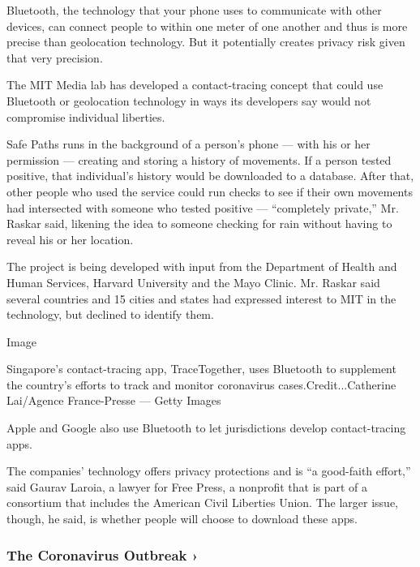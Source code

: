 Bluetooth, the technology that your phone uses to communicate with other
devices, can connect people to within one meter of one another and thus
is more precise than geolocation technology. But it potentially creates
privacy risk given that very precision.

The MIT Media lab has developed a contact-tracing concept that could use
Bluetooth or geolocation technology in ways its developers say would not
compromise individual liberties.

Safe Paths runs in the background of a person's phone --- with his or
her permission --- creating and storing a history of movements. If a
person tested positive, that individual's history would be downloaded to
a database. After that, other people who used the service could run
checks to see if their own movements had intersected with someone who
tested positive --- ``completely private,'' Mr. Raskar said, likening
the idea to someone checking for rain without having to reveal his or
her location.

The project is being developed with input from the Department of Health
and Human Services, Harvard University and the Mayo Clinic. Mr. Raskar
said several countries and 15 cities and states had expressed interest
to MIT in the technology, but declined to identify them.

Image

Singapore's contact-tracing app, TraceTogether, uses Bluetooth to
supplement the country's efforts to track and monitor coronavirus
cases.Credit...Catherine Lai/Agence France-Presse --- Getty Images

Apple and Google also use Bluetooth to let jurisdictions develop
contact-tracing apps.

The companies' technology offers privacy protections and is ``a
good-faith effort,'' said Gaurav Laroia, a lawyer for Free Press, a
nonprofit that is part of a consortium that includes the American Civil
Liberties Union. The larger issue, though, he said, is whether people
will choose to download these apps.

\href{https://www.nytimes3xbfgragh.onion/news-event/coronavirus?action=click\&pgtype=Article\&state=default\&region=MAIN_CONTENT_3\&context=storylines_faq}{}

\hypertarget{the-coronavirus-outbreak-}{%
\subsubsection{The Coronavirus Outbreak
›}\label{the-coronavirus-outbreak-}}

